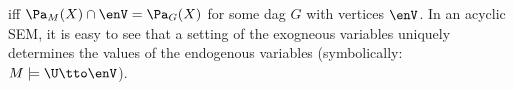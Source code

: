 iff $\Pa_M(X) \cap \enV = \Pa_G(X)$ for some dag $G$ with vertices $\enV$. 
In an acyclic SEM, it is easy to see that a setting of the exogneous variables uniquely determines the values of the endogenous variables
(symbolically: $M \models \U \tto \enV$).
